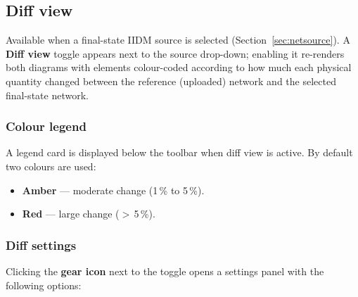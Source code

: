 \documentclass[a4paper,11pt]{article}
\begin{document}
\subsection{Diff view}
\label{sec:diffview}

Available when a final-state IIDM source is selected
(Section~\ref{sec:netsource}). A \textbf{Diff view} toggle appears next to the
source drop-down; enabling it re-renders both diagrams with elements
colour-coded according to how much each physical quantity changed between the
reference (uploaded) network and the selected final-state network.

\subsubsection{Colour legend}

A legend card is displayed below the toolbar when diff view is active. By
default two colours are used:

\begin{itemize}[leftmargin=2em]
  \item {\fboxsep=2pt\colorbox[HTML]{faad14}{\phantom{XX}}} \textbf{Amber} --- moderate
    change (1\,\% to 5\,\%).
  \item {\fboxsep=2pt\colorbox[HTML]{f5222d}{\phantom{XX}}} \textbf{Red}
    --- large change ($>$\,5\,\%).
\end{itemize}

\subsubsection{Diff settings}

Clicking the \textbf{gear icon} next to the toggle opens a settings panel with
the following options:
\end{document}
